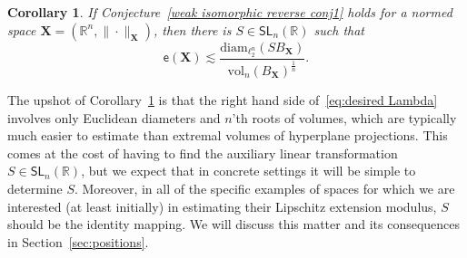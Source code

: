 \documentclass[11pt,reqno]{amsart}
\newcommand{\diam}{\mathrm{diam}}
\newcommand{\X}{\mathbf X}
\newcommand{\R}{\mathbb R}
\newtheorem{corollary}[theorem]{Corollary}
\theoremstyle{remark}
\newcommand{\SL}{\mathsf{SL}}
\newcommand{\ee}{\mathsf{e}}
\newcommand{\vol}{\mathrm{vol}}
\renewcommand{\1}{\mathbf 1}
\begin{document}
\begin{corollary}\label{lem:consequence of reverse isoperimetry} If Conjecture~\ref{weak isomorphic reverse conj1} holds for a normed space $\X=(\R^n,\|\cdot\|_\X)$, then  there is $S\in \SL_n(\R)$ such that
\begin{equation}\label{eq:desired Lambda}
\ee(\X)\lesssim \frac{\diam_{\ell_2^n}(S B_\X)}{\vol_n(B_\X)^{\frac{1}{n}}}.
\end{equation}
\end{corollary}






The upshot of Corollary~\ref{lem:consequence of reverse isoperimetry} is that the right hand side of~\eqref{eq:desired Lambda} involves only Euclidean diameters and  $n$'th roots of volumes, which are typically much easier to estimate than extremal volumes of hyperplane projections. This comes at the cost of having to find the auxiliary linear transformation $S\in \SL_n(\R)$, but we expect that in concrete settings it will be simple to determine $S$. Moreover, in all of the specific examples of spaces for which we are interested (at least initially) in estimating their Lipschitz extension modulus, $S$ should be the identity mapping. We will discuss this matter and its consequences in Section~\ref{sec:positions}.
\end{document}
